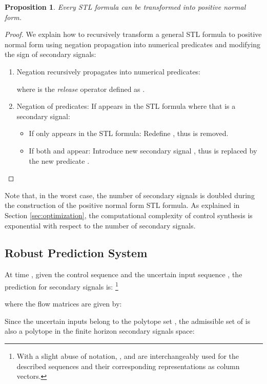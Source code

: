 \documentclass[letterpaper, 10 pt, conference]{ieeeconf}
\newtheorem{proposition}{Proposition}
\begin{document}
\begin{proposition}
Every STL formula can be transformed into positive normal form. 
\end{proposition}
\begin{proof}
We explain how to recursively transform a general STL formula to positive normal form using negation propagation into numerical predicates and modifying the sign of secondary signals:
 \begin{enumerate}
\item Negation recursively  propagates into numerical predicates:

where  is the \emph{release} operator defined as .
\item Negation of predicates: If  appears in the STL formula where  that  is a secondary signal: 
\begin{itemize}
\item If only  appears in the STL formula: Redefine , thus  is removed. 
\item If both  and  appear: Introduce new secondary signal , thus  is replaced by the new predicate .
\end{itemize} 
\end{enumerate}
\end{proof}
Note that, in the worst case, the number of secondary signals is doubled during the construction of the positive normal form STL formula. As explained in Section \ref{sec:optimization}, the computational complexity of control synthesis is exponential with respect to the number of secondary signals. 


\subsection{Robust Prediction System}


At time , given the control sequence  and the uncertain input sequence , the prediction for secondary signals  is:
\footnote{With a slight abuse of notation, , and  are interchangeably used for the described sequences and their corresponding representations as column vectors.}

where the flow matrices  are given by:




Since the uncertain inputs belong to the polytope set , the admissible set of  is also a polytope in the finite horizon secondary signals space:
\end{document}

